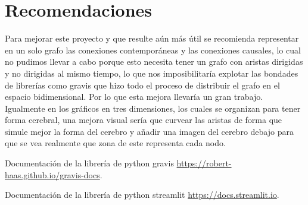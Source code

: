 \documentclass[a4paper,10pt,twocolumn]{article}
\begin{document}
\section{Recomendaciones}\label{sec:rec}

Para mejorar este proyecto y que resulte aún más útil se recomienda representar en un solo grafo las conexiones contemporáneas y las conexiones causales, lo cual no pudimos llevar a cabo porque esto necesita tener un grafo con aristas dirigidas y no dirigidas al mismo tiempo, lo que nos imposibilitaría explotar las bondades de librerías como gravis \cite{gv} que hizo todo el proceso de distribuir el grafo en el espacio bidimensional. Por lo que esta mejora llevaría un gran trabajo. \\

Igualmente en los gráficos en tres dimensiones, los cuales se organizan para tener forma cerebral, una mejora visual sería que curvear las aristas de forma que simule mejor la forma del cerebro y añadir una imagen del cerebro debajo para que se vea realmente que zona de este representa cada nodo.




\begin{thebibliography}{99}

	Documentación de la librería de python gravis \href{https://robert-haas.github.io/gravis-docs/}{https://robert-haas.github.io/gravis-docs}.

	Documentación de la librería de python streamlit \href{https://docs.streamlit.io}{https://docs.streamlit.io}.



\end{thebibliography}



\label{end}
\end{document}
